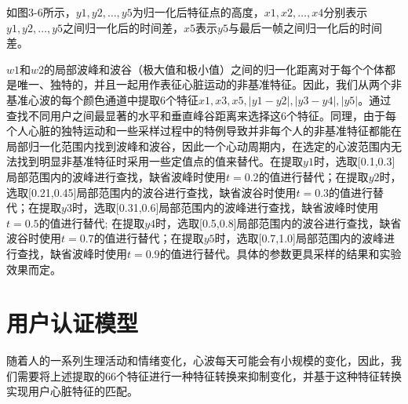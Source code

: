 \par
{如图3-6所示，$y1,y2,\dots,y5$为归一化后特征点的高度，$x1,x2,\dots,x4$分别表示$y1,y2,\dots,y5$之间归一化后的时间差，$x5$表示$y5$与最后一帧之间归一化后的时间差。}
\par
{$w1$和$w2$的局部波峰和波谷（极大值和极小值）之间的归一化距离对于每个个体都是唯一、独特的，并且一起用作表征心脏运动的非基准特征。因此，我们从两个非基准心波的每个颜色通道中提取6个特征${x1,x3,x5,| y1−y2 |,| y3−y4 |,| y5 |}$。通过查找不同用户之间最显著的水平和垂直峰谷距离来选择这6个特征。同理，由于每个人心脏的独特运动和一些采样过程中的特例导致并非每个人的非基准特征都能在局部归一化范围内找到波峰和波谷，因此一个心动周期内，在选定的心波范围内无法找到明显非基准特征时采用一些定值点的值来替代。在提取$y1$时，选取[0.1,0.3]局部范围内的波峰进行查找，缺省波峰时使用$t=0.2$的值进行替代；在提取$y2$时，选取[0.21,0.45]局部范围内的波谷进行查找，缺省波谷时使用$t=0.3$的值进行替代；在提取$y3$时，选取[0.31,0.6]局部范围内的波峰进行查找，缺省波峰时使用$t=0.5$的值进行替代; 在提取$y4$时，选取[0.5,0.8]局部范围内的波谷进行查找，缺省波谷时使用$t=0.7$的值进行替代；在提取$y5$时，选取[0.7,1.0]局部范围内的波峰进行查找，缺省波峰时使用$t=0.9$的值进行替代。具体的参数更具采样的结果和实验效果而定。}
%
%
%
%
%
%

\section{用户认证模型}
{随着人的一系列生理活动和情绪变化，心波每天可能会有小规模的变化，因此，我们需要将上述提取的66个特征进行一种特征转换来抑制变化，并基于这种特征转换实现用户心脏特征的匹配。}
